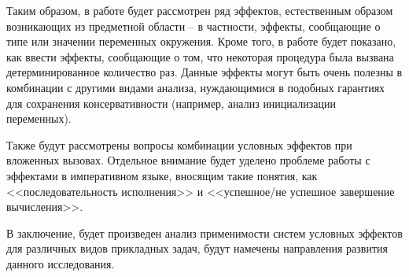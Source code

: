 Таким образом, в работе будет рассмотрен ряд эффектов, естественным образом возникающих из предметной области -- в частности, эффекты, сообщающие о типе или значении переменных окружения. Кроме того, в работе будет показано, как ввести эффекты, сообщающие о том, что некоторая процедура была вызвана детерминированное количество раз. Данные эффекты могут быть очень полезны в комбинации с другими видами анализа, нуждающимися в подобных гарантиях для сохранения консервативности (например, анализ инициализации переменных).

Также будут рассмотрены вопросы комбинации условных эффектов при вложенных вызовах. Отдельное внимание будет уделено проблеме работы с эффектами в императивном языке, вносящим такие понятия, как <<последовательность исполнения>> и <<успешное/не успешное завершение вычисления>>.

В заключение, будет произведен анализ применимости систем условных эффектов для различных видов прикладных задач, будут намечены направления развития данного исследования.

